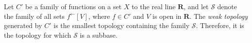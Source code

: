 Let $C'$ be a family of functions on a set $X$ to the real line $\mathbf{R}$, and let $\mathcal{S}$ denote the family of all sets $f^{\leftarrow}[V]$, where $f \in C'$ and $V$ is open in $\mathbf{R}$. The \emph{weak topology} generated by $C'$ is the smallest topology containing the family $\mathcal{S}$. Therefore, it is the topology for which $\mathcal{S}$ is a subbase.
